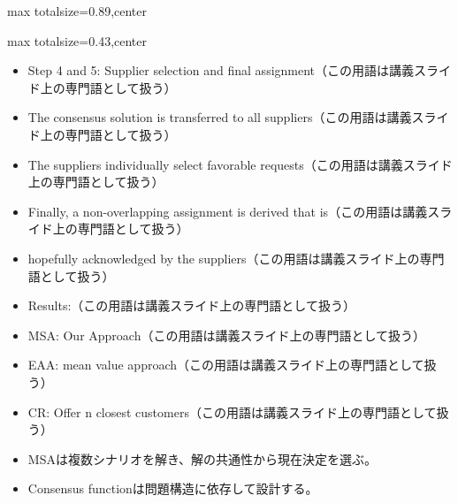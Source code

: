 \begin{minipage}[t]{0.58\textwidth}
\begin{adjustbox}{max totalsize={\textwidth}{0.89\textheight},center}
\begin{minipage}{\textwidth}
\end{minipage}
\end{adjustbox}
\end{minipage}


\clearpage
{}
\begin{minipage}[t]{0.405\textwidth}
\begin{adjustbox}{max totalsize={\textwidth}{0.43\textheight},center}
\begin{minipage}{\textwidth}\scriptsize
{}\begin{itemize}
\item Step 4 and 5: Supplier selection and final assignment（この用語は講義スライド上の専門語として扱う）
\item The consensus solution is transferred to all suppliers（この用語は講義スライド上の専門語として扱う）
\item The suppliers individually select favorable requests（この用語は講義スライド上の専門語として扱う）
\item Finally, a non-overlapping assignment is derived that is（この用語は講義スライド上の専門語として扱う）
\item hopefully acknowledged by the suppliers（この用語は講義スライド上の専門語として扱う）
\item Results:（この用語は講義スライド上の専門語として扱う）
\item MSA: Our Approach（この用語は講義スライド上の専門語として扱う）
\item EAA: mean value approach（この用語は講義スライド上の専門語として扱う）
\item CR: Offer n closest customers（この用語は講義スライド上の専門語として扱う）
\end{itemize}\begin{itemize}
\item MSAは複数シナリオを解き、解の共通性から現在決定を選ぶ。
\item Consensus functionは問題構造に依存して設計する。
\end{itemize}
\end{minipage}
\end{adjustbox}
\end{minipage}\hfill
